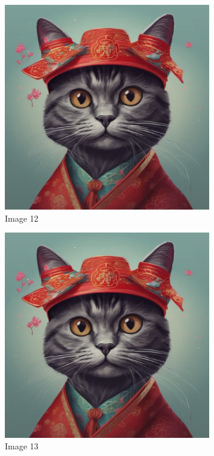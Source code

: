 \documentclass{article}%
\begin{document}
\begin{figure}[h!]%
\centering%
\includegraphics[width=0.8\textwidth]{source/image1.png}%
\caption{Image 12}%
\end{figure}

%


\begin{figure}[h!]%
\centering%
\includegraphics[width=0.8\textwidth]{source/image1.png}%
\caption{Image 13}%
\end{figure}

%
\end{document}
